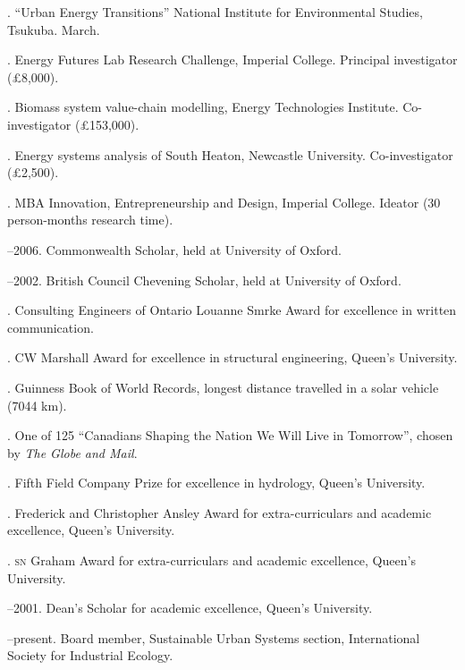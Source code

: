 \documentclass[11pt,a4paper]{article}
\begin{document}
. ``Urban Energy Transitions'' National Institute for Environmental Studies, Tsukuba.  March.


\bigskip

\noindent{}%
%
. Energy Futures Lab Research Challenge, Imperial College.  Principal investigator (£8,000).

. Biomass system value-chain modelling, Energy Technologies Institute.  Co-investigator (£153,000).

. Energy systems analysis of South Heaton, Newcastle University.  Co-investigator (£2,500).

. MBA Innovation, Entrepreneurship and Design, Imperial College.  Ideator (30 person-months research time).

--2006.  Commonwealth Scholar, held at University of Oxford.

--2002.  British Council Chevening Scholar, held at University of Oxford.

.  Consulting Engineers of Ontario Louanne Smrke Award for excellence in written communication.

. CW Marshall Award for excellence in structural engineering, Queen's University.

.  Guinness Book of World Records, longest distance travelled in a solar vehicle (7044 km).

. One of 125 ``Canadians Shaping the Nation We Will Live in Tomorrow'', chosen by \emph{The Globe and Mail}.

.  Fifth Field Company Prize for excellence in hydrology, Queen's University.

. Frederick and Christopher Ansley Award for extra-curriculars and academic excellence, Queen's University.

.  \textsc{sn} Graham Award for extra-curriculars and academic excellence, Queen's University.

--2001.  Dean's Scholar for academic excellence, Queen's University.

\bigskip 

\noindent{}%
%
--present. Board member, Sustainable Urban Systems section, International Society for Industrial Ecology.
\end{document}

